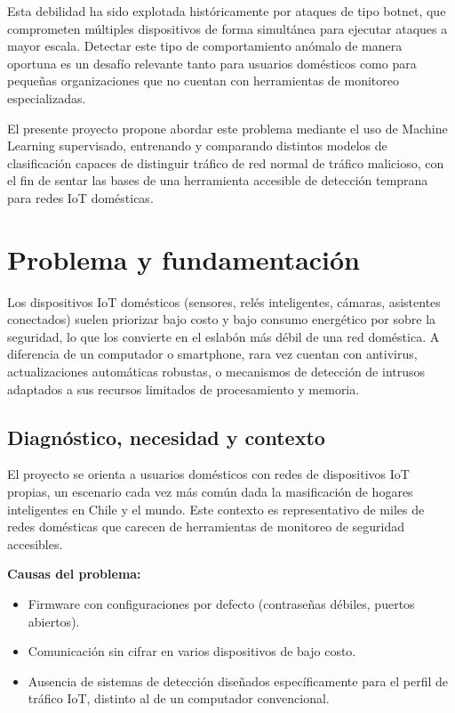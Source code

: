 \documentclass[11pt,a4paper]{article}
\begin{document}
Esta debilidad ha sido explotada históricamente por ataques de tipo botnet, que comprometen múltiples dispositivos de forma simultánea para ejecutar ataques a mayor escala. Detectar este tipo de comportamiento anómalo de manera oportuna es un desafío relevante tanto para usuarios domésticos como para pequeñas organizaciones que no cuentan con herramientas de monitoreo especializadas.

El presente proyecto propone abordar este problema mediante el uso de Machine Learning supervisado, entrenando y comparando distintos modelos de clasificación capaces de distinguir tráfico de red normal de tráfico malicioso, con el fin de sentar las bases de una herramienta accesible de detección temprana para redes IoT domésticas.

\section{Problema y fundamentación}
Los dispositivos IoT domésticos (sensores, relés inteligentes, cámaras, asistentes conectados) suelen priorizar bajo costo y bajo consumo energético por sobre la seguridad, lo que los convierte en el eslabón más débil de una red doméstica. A diferencia de un computador o smartphone, rara vez cuentan con antivirus, actualizaciones automáticas robustas, o mecanismos de detección de intrusos adaptados a sus recursos limitados de procesamiento y memoria.

\subsection{Diagnóstico, necesidad y contexto}
El proyecto se orienta a usuarios domésticos con redes de dispositivos IoT propias, un escenario cada vez más común dada la masificación de hogares inteligentes en Chile y el mundo. Este contexto es representativo de miles de redes domésticas que carecen de herramientas de monitoreo de seguridad accesibles.

\textbf{Causas del problema:}
\begin{itemize}
    \item Firmware con configuraciones por defecto (contraseñas débiles, puertos abiertos).
    \item Comunicación sin cifrar en varios dispositivos de bajo costo.
    \item Ausencia de sistemas de detección diseñados específicamente para el perfil de tráfico IoT, distinto al de un computador convencional.
\end{itemize}
\end{document}
